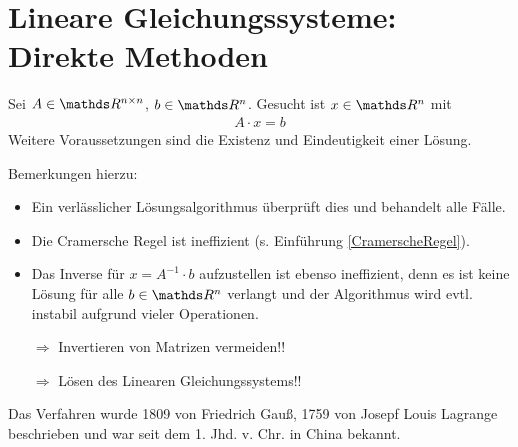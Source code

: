 % 
% 
% 
% 


\chapter{Lineare Gleichungssysteme: Direkte Methoden}
Sei $ A \in \R^{n\times n}$, $b \in \R^n$. Gesucht ist $x\in \R^n$ mit 
\begin{gather*}
  A\cdot x = b
\end{gather*}
Weitere Voraussetzungen sind die Existenz und Eindeutigkeit einer
Lösung.

Bemerkungen hierzu:
\begin{itemize}
\item Ein verlässlicher Lösungsalgorithmus überprüft dies und behandelt alle Fälle. 
\item Die Cramersche Regel ist ineffizient (s. Einführung
  \ref{CramerscheRegel}).
\item Das Inverse für $x=A^{-1}\cdot b$ aufzustellen ist ebenso ineffizient,
  denn es ist keine Lösung für alle $b\in \R^n$ verlangt
  und der Algorithmus wird evtl. instabil aufgrund vieler Operationen.
\item [$\Rightarrow$] Invertieren von Matrizen vermeiden!!
\item [$\Rightarrow$] Lösen des Linearen Gleichungssystems!!
\end{itemize}

 \label{2.2.1}
Das Verfahren wurde 1809 von Friedrich Gauß,
1759 von Josepf Louis Lagrange beschrieben
und war seit dem 1. Jhd. v. Chr. in China bekannt.

